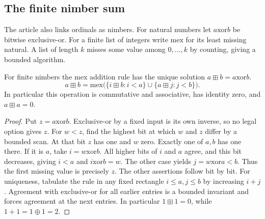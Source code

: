 \subsection{The finite nimber sum}
The article also links ordinals as nimbers. For natural numbers let $a\mathbin{\mathrm{xor}}b$ be bitwise exclusive-or. For a finite list of integers write $\mathrm{mex}$ for its least missing natural. A list of length $k$ misses some value among $0,\ldots,k$ by counting, giving a bounded algorithm.
\begin{theorem}
For finite nimbers the mex addition rule has the unique solution $a\boxplus b=a\mathbin{\mathrm{xor}}b$.
\[
 a\boxplus b=\mathrm{mex}\big(\{i\boxplus b:i<a\}\cup\{a\boxplus j:j<b\}\big).
\]
In particular this operation is commutative and associative, has identity zero, and $a\boxplus a=0$.
\end{theorem}
\begin{proof}
Put $z=a\mathbin{\mathrm{xor}}b$. Exclusive-or by a fixed input is its own inverse, so no legal option gives $z$. For $w<z$, find the highest bit at which $w$ and $z$ differ by a bounded scan. At that bit $z$ has one and $w$ zero. Exactly one of $a,b$ has one there. If it is $a$, take $i=w\mathbin{\mathrm{xor}}b$. All higher bits of $i$ and $a$ agree, and this bit decreases, giving $i<a$ and $i\mathbin{\mathrm{xor}}b=w$. The other case yields $j=w\mathbin{\mathrm{xor}}a<b$. Thus the first missing value is precisely $z$. The other assertions follow bit by bit. For uniqueness, tabulate the rule in any fixed rectangle $i\le a,j\le b$ by increasing $i+j$. Agreement with exclusive-or for all earlier entries is a bounded invariant and forces agreement at the next entries. In particular $1\boxplus1=0$, while $1+1=1\oplus1=2$.
\end{proof}
